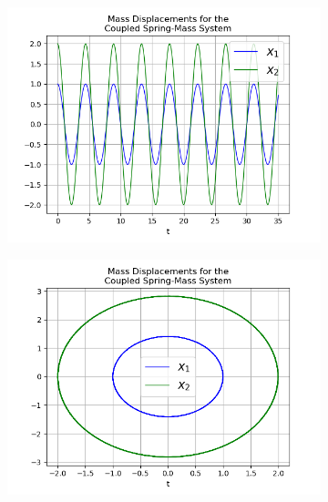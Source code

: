 \documentclass{article}
\begin{document}
\begin{figure}[h!]
  \centering
  \begin{subfigure}[b]{0.32\linewidth}
    \includegraphics[width=\linewidth]{two_springs211.png}
     \caption{}
  \end{subfigure}
  \begin{subfigure}[b]{0.32\linewidth}
    \includegraphics[width=\linewidth]{two_springs212.png}
    \caption{}
  \end{subfigure}
  \begin{subfigure}[b]{0.32\linewidth}

\end{subfigure}
\end{figure}
\end{document}
